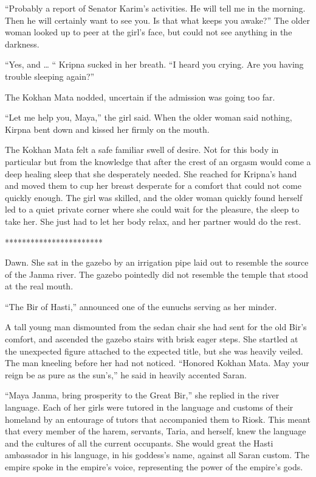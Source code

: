 \documentclass{article}
\begin{document}
	“Probably a report of Senator Karim’s activities. He will tell me in the morning. Then he will certainly want to see you. Is that what keeps you awake?” The older woman looked up to peer at the girl’s face, but could not see anything in the darkness. 
	
	“Yes, and … “ Kripna sucked in her breath. “I heard you crying. Are you having trouble sleeping again?”
	
	The Kokhan Mata nodded, uncertain if the admission was going too far. 
	
	“Let me help you, Maya,” the girl said. When the older woman said nothing, Kirpna bent down and kissed her firmly on the mouth. 
	
	The Kokhan Mata felt a safe familiar swell of desire. Not for this body in particular but from the knowledge that after the crest of an orgasm would come a deep healing sleep that she desperately needed. She reached for Kripna’s hand and moved them to cup her breast desperate for a comfort that could not come quickly enough. The girl was skilled, and the older woman quickly found herself led to a quiet private corner where she could wait for the pleasure, the sleep to take her. She just had to let her body relax, and her partner would do the rest.
	
	***********************
	
	Dawn. She sat in the gazebo by an irrigation pipe laid out to resemble the source of the Janma river. The gazebo pointedly did not resemble the temple that stood at the real mouth.
	
	“The Bir of Hasti,” announced one of the eunuchs serving as her minder. 
	
	A tall young man dismounted from the sedan chair she had sent for the old Bir’s comfort, and ascended the gazebo stairs with brisk eager steps. She startled at the unexpected figure attached to the expected title, but she was heavily veiled. The man kneeling before her had not noticed. “Honored Kokhan Mata. May your reign be as pure as the sun’s,” he said in heavily accented Saran. 
	
	“Maya Janma, bring prosperity to the Great Bir,” she replied in the river language. Each of her girls were tutored in the language and customs of their homeland by an entourage of tutors that accompanied them to Riosk. This meant that every member of the harem, servants, Taria, and herself, knew the language and the cultures of all the current occupants. She would great the Hasti ambassador in his language, in his goddess’s name, against all Saran custom. The empire spoke in the empire’s voice, representing the power of the empire’s gods.
	
\end{document}

